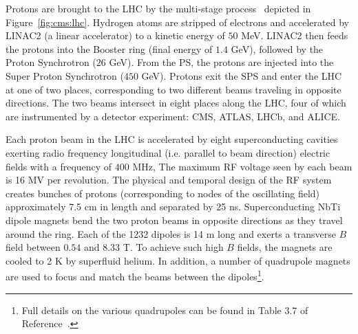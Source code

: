 Protons are brought to the LHC by the multi-stage process~\cite{lhctdr3} depicted in Figure~\ref{fig:cms:lhc}.
Hydrogen atoms are stripped of electrons and accelerated by LINAC2 (a linear accelerator) to a kinetic energy of $50$ MeV.
LINAC2 then feeds the protons into the Booster ring (final energy of $1.4$ GeV), followed by the Proton Synchrotron ($26$ GeV).
From the PS, the protons are injected into the Super Proton Synchrotron ($450$ GeV).
Protons exit the SPS and enter the LHC at one of two places, corresponding to two different beams traveling in opposite directions.
The two beams intersect in eight places along the LHC, four of which are instrumented by a detector experiment: CMS, ATLAS, LHCb, and ALICE. 

Each proton beam in the LHC is accelerated by eight superconducting cavities exerting radio frequency longitudinal (i.e. parallel to beam direction) electric fields with a frequency of $400$ MHz,
The maximum RF voltage seen by each beam is 16 MV per revolution.
The physical and temporal design of the RF system creates bunches of protons (corresponding to nodes of the oscillating field) approximately 7.5 cm in length and separated by 25 ns. 
Superconducting NbTi dipole magnets bend the two proton beams in opposite directions as they travel around the ring. 
Each of the 1232 dipoles is 14 m long and exerts a transverse $B$ field between $0.54$ and $8.33$ T.
To achieve such high $B$ fields, the magnets are cooled to 2 K by superfluid helium.
In addition, a number of quadrupole magnets are used to focus and match the beams between the dipoles\footnote{Full details on the various quadrupoles can be found in Table 3.7 of Reference~\cite{lhcjinst}.}.

